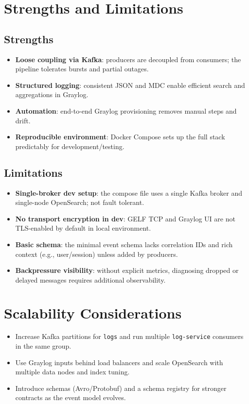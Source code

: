 \documentclass[12pt,a4paper]{report}
\begin{document}
\section{Strengths and Limitations}
\subsection*{Strengths}
\begin{itemize}[leftmargin=1.2cm]
  \item \textbf{Loose coupling via Kafka}: producers are decoupled from consumers; the pipeline tolerates bursts and partial outages.
  \item \textbf{Structured logging}: consistent JSON and MDC enable efficient search and aggregations in Graylog.
  \item \textbf{Automation}: end-to-end Graylog provisioning removes manual steps and drift.
  \item \textbf{Reproducible environment}: Docker Compose sets up the full stack predictably for development/testing.
\end{itemize}

\subsection*{Limitations}
\begin{itemize}[leftmargin=1.2cm]
  \item \textbf{Single-broker dev setup}: the compose file uses a single Kafka broker and single-node OpenSearch; not fault tolerant.
  \item \textbf{No transport encryption in dev}: GELF TCP and Graylog UI are not TLS-enabled by default in local environment.
  \item \textbf{Basic schema}: the minimal event schema lacks correlation IDs and rich context (e.g., user/session) unless added by producers.
  \item \textbf{Backpressure visibility}: without explicit metrics, diagnosing dropped or delayed messages requires additional observability.
\end{itemize}

\section{Scalability Considerations}
\begin{itemize}[leftmargin=1.2cm]
  \item Increase Kafka partitions for \texttt{logs} and run multiple \texttt{log-service} consumers in the same group.
  \item Use Graylog inputs behind load balancers and scale OpenSearch with multiple data nodes and index tuning.
  \item Introduce schemas (Avro/Protobuf) and a schema registry for stronger contracts as the event model evolves.
\end{itemize}
\end{document}
